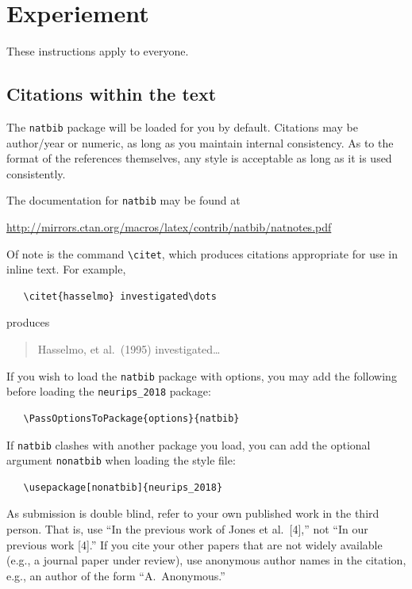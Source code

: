 \documentclass{article}
\begin{document}
\section{Experiement}\label{sec:experiment}

These instructions apply to everyone.

\subsection{Citations within the text}

The \verb+natbib+ package will be loaded for you by default.  Citations may be
author/year or numeric, as long as you maintain internal consistency.  As to the
format of the references themselves, any style is acceptable as long as it is
used consistently.

The documentation for \verb+natbib+ may be found at
\begin{center}
  \url{http://mirrors.ctan.org/macros/latex/contrib/natbib/natnotes.pdf}
\end{center}
Of note is the command \verb+\citet+, which produces citations appropriate for
use in inline text.  For example,
\begin{verbatim}
   \citet{hasselmo} investigated\dots
\end{verbatim}
produces
\begin{quote}
  Hasselmo, et al.\ (1995) investigated\dots
\end{quote}

If you wish to load the \verb+natbib+ package with options, you may add the
following before loading the \verb+neurips_2018+ package:
\begin{verbatim}
   \PassOptionsToPackage{options}{natbib}
\end{verbatim}

If \verb+natbib+ clashes with another package you load, you can add the optional
argument \verb+nonatbib+ when loading the style file:
\begin{verbatim}
   \usepackage[nonatbib]{neurips_2018}
\end{verbatim}

As submission is double blind, refer to your own published work in the third
person. That is, use ``In the previous work of Jones et al.\ [4],'' not ``In our
previous work [4].'' If you cite your other papers that are not widely available
(e.g., a journal paper under review), use anonymous author names in the
citation, e.g., an author of the form ``A.\ Anonymous.''
\end{document}
